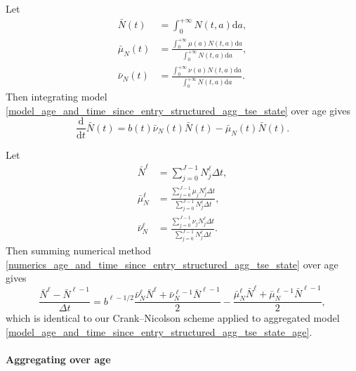 \documentclass[USenglish]{article}
\newcommand{\md}{\mathrm{d}}
\begin{document}
Let
\begin{subequations}
  \begin{align}
    \bar{N}(t)
    &= \int_0^{+\infty} N(t, a) \md a,
    \\
    \bar{\mu}_N(t)
    &= \frac{\int_0^{+\infty} \mu(a) N(t, a) \md a}
    {\int_0^{+\infty} N(t, a) \md a},
    \\
    \bar{\nu}_N(t)
    &= \frac{\int_0^{+\infty} \nu(a) N(t, a) \md a}
    {\int_0^{+\infty} N(t, a) \md a}.
  \end{align}
\end{subequations}
Then integrating model
\eqref{model_age_and_time_since_entry_structured_agg_tse_state} over
age gives
\begin{equation}
  \label{model_age_and_time_since_entry_structured_agg_tse_state_age}
  \frac{\md}{\md t} \bar{N}(t)
  = b(t) \bar{\nu}_N(t) \bar{N}(t)
  - \bar{\mu}_N(t) \bar{N}(t).
\end{equation}

Let
\begin{subequations}
  \begin{align}
    \bar{N}^{\ell}
    &= \sum_{j = 0}^{J - 1} N_j^{\ell} \Delta t,
    \\
    \bar{\mu}_N^{\ell}
    &= \frac{\sum_{j = 0}^{J - 1} \mu_j N_j^{\ell} \Delta t}
    {\sum_{j = 0}^{J - 1} N_j^{\ell} \Delta t},
    \\
    \bar{\nu}_N^{\ell}
    &= \frac{\sum_{j = 0}^{J - 1} \nu_j N_j^{\ell} \Delta t}
    {\sum_{j = 0}^{J - 1} N_j^{\ell} \Delta t}.
  \end{align}
\end{subequations}
Then summing numerical method
\eqref{numerics_age_and_time_since_entry_structured_agg_tse_state}
over age gives
\begin{equation}
  \label{numerics_age_and_time_since_entry_structured_agg_tse_state_age}
  \frac{\bar{N}^{\ell} - \bar{N}^{\ell - 1}}{\Delta t}
  = b^{\ell - 1 / 2} \frac{\bar{\nu}_N^{\ell} \bar{N}^{\ell}
    + \bar{\nu}_N^{\ell - 1} \bar{N}^{\ell - 1}}{2}
  - \frac{\bar{\mu}_N^{\ell} \bar{N}^{\ell}
    + \bar{\mu}_N^{\ell - 1} \bar{N}^{\ell - 1}}{2},
\end{equation}
which is identical to our Crank--Nicolson scheme applied to aggregated
model
\eqref{model_age_and_time_since_entry_structured_agg_tse_state_age}.


\paragraph{Aggregating over age}
\end{document}
